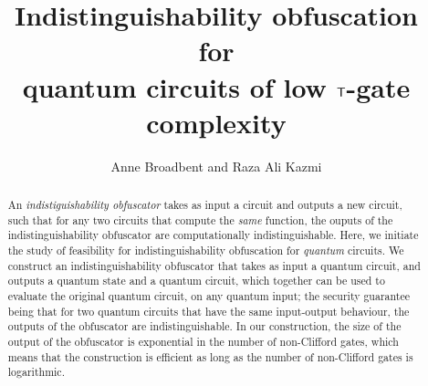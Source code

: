\documentclass[english,11pt]{article}
\title{Indistinguishability obfuscation \\for\\ quantum circuits of low ${\sf T}$-gate complexity}
\author{Anne Broadbent and Raza Ali Kazmi}
\affil{University of Ottawa, Department of Mathematics and Statistics,\\\texttt{\{abroadbe,rkazmi\}@uottawa.ca.}}
\date{} %
\begin{document}
\maketitle

\begin{abstract}
An \emph{indistiguishability obfuscator} takes as input a circuit %
and outputs a new circuit, %
such that for any two circuits that compute the  \emph{same} function, the ouputs of the indistinguishability obfuscator are 
 computationally indistinguishable. Here, we initiate the study of feasibility for indistinguishability obfuscation for \emph{quantum} circuits. We construct an indistinguishability  obfuscator that takes as input a quantum circuit, and outputs a quantum state and a quantum circuit, which together can be used to evaluate the original quantum circuit, on any quantum input; the security guarantee being that for two quantum circuits that have the same input-output behaviour, the outputs of the obfuscator are indistinguishable. In our construction, the size of the output of the obfuscator is exponential in the number of non-Clifford gates, which means that the construction is efficient as long as the number of non-Clifford gates is logarithmic. 
\end{abstract}

\newpage

\setcounter{tocdepth}{2}
\tableofcontents
\clearpage
{}
\setcounter{page}{1}







%



%
\end{document}
